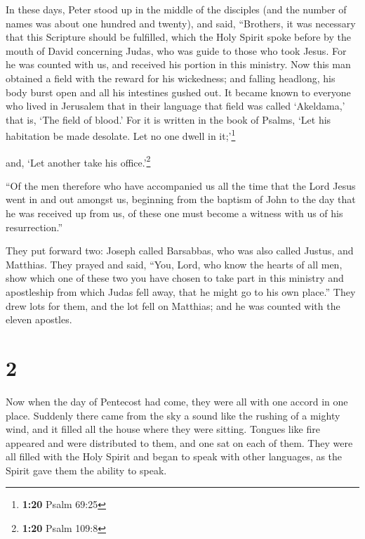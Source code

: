 In these days, Peter stood up in the middle of the
disciples (and the number of names was about one hundred and twenty),
and said,  ``Brothers, it was necessary that this
Scripture should be fulfilled, which the Holy Spirit spoke before by the
mouth of David concerning Judas, who was guide to those who took Jesus.
 For he was counted with us, and received his portion in
this ministry.  Now this man obtained a field with the
reward for his wickedness; and falling headlong, his body burst open and
all his intestines gushed out.  It became known to
everyone who lived in Jerusalem that in their language that field was
called `Akeldama,' that is, `The field of blood.'  For it
is written in the book of Psalms, `Let his habitation be made desolate.
Let no one dwell in it;'\footnote{\textbf{1:20} Psalm 69:25}

and, `Let another take his office.'\footnote{\textbf{1:20} Psalm 109:8}

 ``Of the men therefore who have accompanied us all the
time that the Lord Jesus went in and out amongst us, 
beginning from the baptism of John to the day that he was received up
from us, of these one must become a witness with us of his
resurrection.''

 They put forward two: Joseph called Barsabbas, who was
also called Justus, and Matthias.  They prayed and said,
``You, Lord, who know the hearts of all men, show which one of these two
you have chosen  to take part in this ministry and
apostleship from which Judas fell away, that he might go to his own
place.''  They drew lots for them, and the lot fell on
Matthias; and he was counted with the eleven apostles.

\hypertarget{section-1}{%
\section{2}\label{section-1}}

 Now when the day of Pentecost had come, they were all
with one accord in one place.  Suddenly there came from
the sky a sound like the rushing of a mighty wind, and it filled all the
house where they were sitting.  Tongues like fire appeared
and were distributed to them, and one sat on each of them.
 They were all filled with the Holy Spirit and began to
speak with other languages, as the Spirit gave them the ability to
speak.

